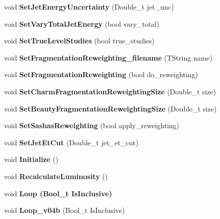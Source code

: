 \begin{CompactItemize}
\item 
void \textbf{Set\-Jet\-Energy\-Uncertainty} (Double\_\-t jet\_\-unc)\label{classTMiniNtupleAnalyzer_93cc807288017cbbc21426f194af00d0}

\item 
void \textbf{Set\-Vary\-Total\-Jet\-Energy} (bool vary\_\-total)\label{classTMiniNtupleAnalyzer_6a6aba95f0df2e6bd90cc297df38cba7}

\item 
void \textbf{Set\-True\-Level\-Studies} (bool true\_\-studies)\label{classTMiniNtupleAnalyzer_6969912103555ef6e2fabbfffd3f11b7}

\item 
void \textbf{Set\-Fragmentation\-Reweighting\_\-filename} (TString name)\label{classTMiniNtupleAnalyzer_2e860e5d4a99dbd2a7bb3f54e6d69ad8}

\item 
void \textbf{Set\-Fragmentation\-Reweighting} (bool do\_\-reweighting)\label{classTMiniNtupleAnalyzer_2e9486b40352e4028efc8b748127a761}

\item 
void \textbf{Set\-Charm\-Fragmentation\-Reweighting\-Size} (Double\_\-t size)\label{classTMiniNtupleAnalyzer_89dff5653ce3d5c7758610cb8e212c8e}

\item 
void \textbf{Set\-Beauty\-Fragmentation\-Reweighting\-Size} (Double\_\-t size)\label{classTMiniNtupleAnalyzer_a3c6811689465feed0d56189a8d5fdce}

\item 
void \textbf{Set\-Sashas\-Reweighting} (bool apply\_\-reweighting)\label{classTMiniNtupleAnalyzer_f5d84f6d73304e673fd552217f754572}

\item 
void \textbf{Set\-Jet\-Et\-Cut} (Double\_\-t jet\_\-et\_\-cut)\label{classTMiniNtupleAnalyzer_4279e3fdf8fb6c409354c2cc725e9eb1}

\item 
void \textbf{Initialize} ()\label{classTMiniNtupleAnalyzer_f45fbaeab2c8ac85850ebe02cf4aaa61}

\item 
void \textbf{Recalculate\-Luminosity} ()\label{classTMiniNtupleAnalyzer_87ec4b8d4497b61f823dc25d83caa1ab}

\item 
void \bf{Loop} (Bool\_\-t Is\-Inclusive)
\item 
void \textbf{Loop\_\-v04b} (Bool\_\-t Is\-Inclusive)\label{classTMiniNtupleAnalyzer_d226b43fbd71635668eb39a8646265a4}


\end{CompactItemize}
